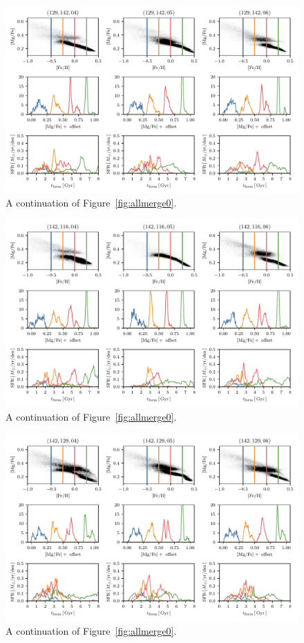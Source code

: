 \begin{appendices}
\begin{figure}
  \centering
  \includegraphics[width=\textwidth]{ch3/allmerge5.pdf}
  \caption{A continuation of Figure~\ref{fig:allmerge0}.}
  \label{fig:allmerge5}
\end{figure}

\begin{figure}
  \centering
  \includegraphics[width=\textwidth]{ch3/allmerge6.pdf}
  \caption{A continuation of Figure~\ref{fig:allmerge0}.}
  \label{fig:allmerge6}
\end{figure}

\begin{figure}
  \centering
  \includegraphics[width=\textwidth]{ch3/allmerge7.pdf}
  \caption{A continuation of Figure~\ref{fig:allmerge0}.}
  \label{fig:allmerge7}
\end{figure}


\end{appendices}
